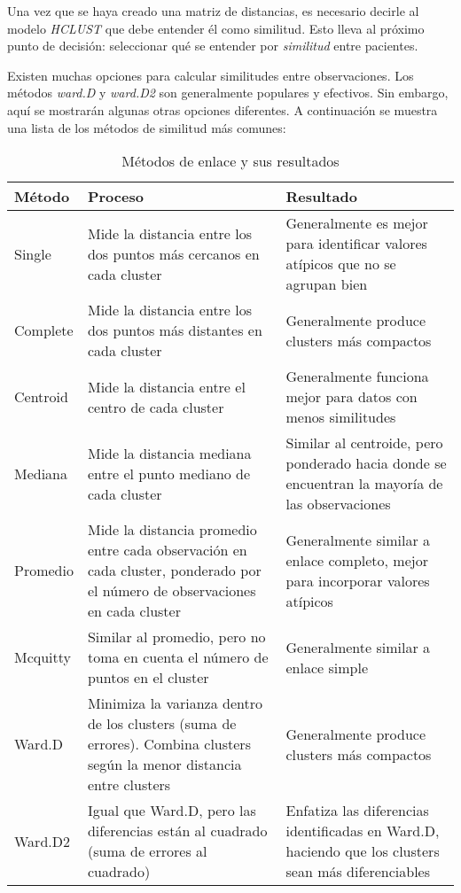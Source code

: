 Una vez que se haya creado una matriz de distancias, es necesario decirle al modelo \textit{HCLUST} que debe entender él como similitud. Esto lleva al próximo punto de decisión: seleccionar qué se entender por \textit{similitud} entre pacientes.

Existen muchas opciones para calcular similitudes entre observaciones. Los métodos \textit{ward.D} y \textit{ward.D2} son generalmente populares y efectivos. Sin embargo, aquí se mostrarán algunas otras opciones diferentes. A continuación se muestra una lista de los métodos de similitud más comunes:

\begin{table}[H]
    \centering
    \begin{tabular}{|p{3.5cm}|p{6cm}|p{6cm}|}
    \hline
    \textbf{Método} & \textbf{Proceso} & \textbf{Resultado} \\
    \hline
    Single & Mide la distancia entre los dos puntos más cercanos en cada cluster & Generalmente es mejor para identificar valores atípicos que no se agrupan bien \\
    \hline
    Complete & Mide la distancia entre los dos puntos más distantes en cada cluster & Generalmente produce clusters más compactos \\
    \hline
    Centroid & Mide la distancia entre el centro de cada cluster & Generalmente funciona mejor para datos con menos similitudes \\
    \hline
    Mediana & Mide la distancia mediana entre el punto mediano de cada cluster & Similar al centroide, pero ponderado hacia donde se encuentran la mayoría de las observaciones \\
    \hline
    Promedio & Mide la distancia promedio entre cada observación en cada cluster, ponderado por el número de observaciones en cada cluster & Generalmente similar a enlace completo, mejor para incorporar valores atípicos \\
    \hline
    Mcquitty & Similar al promedio, pero no toma en cuenta el número de puntos en el cluster & Generalmente similar a enlace simple \\
    \hline
    Ward.D & Minimiza la varianza dentro de los clusters (suma de errores). Combina clusters según la menor distancia entre clusters & Generalmente produce clusters más compactos \\
    \hline
    Ward.D2 & Igual que Ward.D, pero las diferencias están al cuadrado (suma de errores al cuadrado) & Enfatiza las diferencias identificadas en Ward.D, haciendo que los clusters sean más diferenciables \\
    \hline
    \end{tabular}
    \caption{Métodos de enlace y sus resultados}
\end{table}

